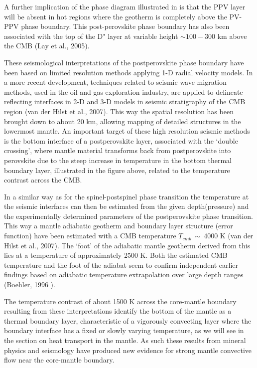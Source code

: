 A further implication of the phase diagram illustrated in 
is that the PPV layer will be absent in hot regions where the
geotherm is completely above the PV-PPV phase boundary.
This post-perovskite phase boundary has also been associated with the 
top of the D" layer at variable height $\sim 100-300$ km above the CMB
(Lay et al., 2005).


These seismological interpretations of the postperovskite 
phase boundary have been based on limited resolution methods applying
1-D radial velocity models.
In a more recent development, techniques related to seismic wave
migration methods, used in the oil and gas exploration industry,
are applied to delineate reflecting interfaces in 2-D and 3-D models
in seismic stratigraphy of the CMB region (van der Hilst et al., 2007).
This way the spatial resolution has been brought down to about 20 km,
allowing mapping of detailed  structures in the lowermost mantle.
An important target of these high resolution seismic methods is 
the bottom interface of a postperovskite layer,
associated with the `double crossing', where mantle material 
transforms back from postperovskite into perovskite due to the steep 
increase in temperature in the bottom thermal boundary layer, 
illustrated in the figure above,
related to the temperature contrast across the CMB.

In a similar way as for the spinel-postspinel phase transition
the temperature  at the seismic interfaces can then be estimated
from the given depth(pressure) and the experimentally determined
parameters of the postperovskite phase transition.
This way a mantle adiabatic geotherm and boundary 
layer structure (error function) have been estimated with a CMB
temperature $T_{cmb}~\sim~ 4000$ K (van der Hilst et al., 2007).
The `foot' of the adiabatic mantle geotherm derived from this
lies at a temperature of approximately 2500 K.
Both the estimated CMB temperature and the foot of the adiabat
seem to confirm independent earlier findings based on adiabatic
temperature extrapolation over large depth ranges (Boehler, 1996 \cite{boeh96}). 

The temperature contrast of about 1500 K across the core-mantle
boundary resulting from these interpretations identify the
bottom of the mantle as a thermal boundary layer,
characteristic of a vigorously convecting layer where the boundary
interface has a fixed or slowly varying temperature,
as we will see in the section on heat transport in the mantle.
As such these results from mineral physics and seismology have
produced new evidence for strong mantle convective flow near the
core-mantle boundary.
